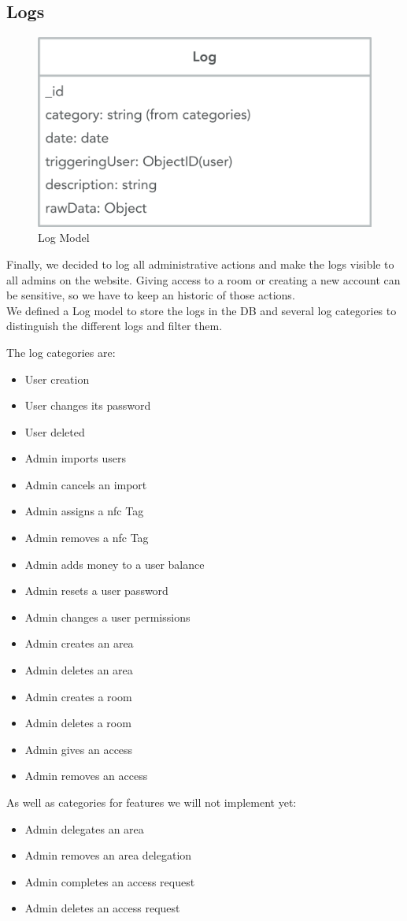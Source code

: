 \documentclass[twoside, openright,11pt,a4paper]{book}
\begin{document}
\subsection{Logs}
\begin{figure}[H]
\begin{center}
	\includegraphics[width=.6\textwidth]{assets/log_model}
	\caption{Log Model}
\end{center}
\end{figure}
Finally, we decided to log all administrative actions and make the logs visible to all admins on the website. Giving access to a room or creating a new account can be sensitive, so we have to keep an historic of those actions.\\

We defined a Log model to store the logs in the DB and several log categories to distinguish the different logs and filter them.

The log categories are:
\begin{itemize}
\item User creation
\item User changes its password
\item User deleted
\item Admin imports users
\item Admin cancels an import
\item Admin assigns a \gls{nfc} Tag
\item Admin removes a \gls{nfc} Tag
\item Admin adds money to a user balance
\item Admin resets a user password
\item Admin changes a user permissions
\item Admin creates an area
\item Admin deletes an area
\item Admin creates a room
\item Admin deletes a room
\item Admin gives an access
\item Admin removes an access
\end{itemize}
As well as categories for features we will not implement yet:
\begin{itemize}
\item Admin delegates an area
\item Admin removes an area delegation
\item Admin completes an access request
\item Admin deletes an access request
\end{itemize}
\end{document}
